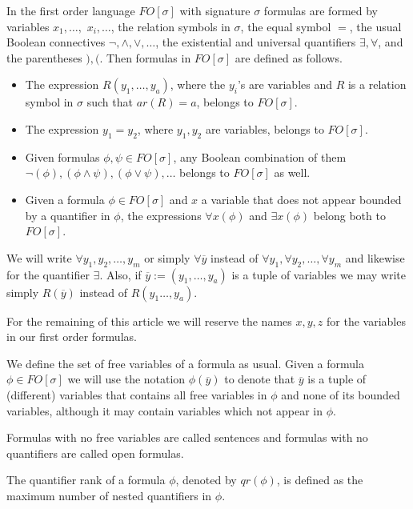 \documentclass[12pt,notitlepage,a4paper]{article}
\theoremstyle{definition}
\begin{document}
In the first order language $FO[\sigma]$ with signature $\sigma$ 
formulas are formed by variables $x_1,\dots,$ $x_i,\dots$,
the relation symbols in $\sigma$, the equal symbol $=$,
the usual Boolean connectives $\neg, \wedge, \vee, \dots$, 
the existential and universal quantifiers $\exists, \forall$, and
the parentheses $),($. Then formulas in $FO[\sigma]$ are defined as 
follows.
\vspace*{-0.2em}
\begin{itemize}[topsep=1pt, itemsep=1pt]
	\item The expression $R(y_1,\dots,y_a)$, where the $y_i$'s are variables and $R$
	is a relation symbol in $\sigma$ such that $ar(R)=a$,
	belongs to $FO[\sigma]$.
	\item The expression $y_1=y_2$, where $y_1, y_2$ are variables, 
	belongs to $FO[\sigma]$.
	\item Given formulas $\phi, \psi \in FO[\sigma]$, any Boolean combination of them
	$\neg(\phi), (\phi \wedge \psi), (\phi \vee \psi), \dots$ belongs to $FO[\sigma]$ as well.
	\item Given a formula $\phi \in FO[\sigma]$ and $x$ a variable that 
	does not appear bounded
	by a quantifier in $\phi$, the expressions $\forall x (\phi)$ and 
	$\exists x (\phi)$ belong both to $FO[\sigma]$. 
\end{itemize}  
We will write $\forall y_1, y_2,\dots, y_m$ or simply $\forall \overline{y}$
instead of  
$\forall y_1, \forall y_2,\dots, \forall y_m$ and likewise for
the quantifier $\exists$. Also, if $\overline{y}:=(y_1,\dots,y_a)$ is a
tuple of variables we may write simply $R(\overline{y})$ instead
of $R(y_1\dots,y_a)$.\par
For the remaining of this article we will reserve the names $x,y,z$
for the variables in our first order formulas.\par
We define the set of free variables of a formula as usual. 
Given a formula $\phi\in FO[\sigma]$ we will use the notation $\phi(\overline{y})$ 
to denote that $\overline{y}$ is a tuple of 
(different) variables that contains all free variables in $\phi$ and
none of its bounded variables, although it may contain variables
which not appear in $\phi$. \par
Formulas with no free variables are called sentences and 
formulas with no quantifiers are called open formulas. \par
The quantifier rank of a formula $\phi$, denoted by $qr(\phi)$, 
is defined as the maximum number of nested quantifiers in $\phi$. \par
\end{document}

